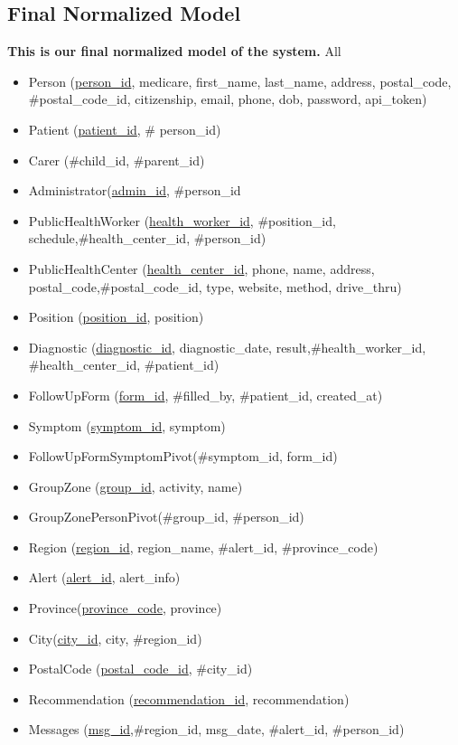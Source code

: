 \documentclass{article}
\begin{document}
\subsection{Final Normalized Model}
\begin{tcolorbox}
\textbf{This is our final normalized model of the system.} All
\begin{itemize}
    \item Person (\underline{person\_id}, medicare, first\_name, last\_name, address, postal\_code, \#postal\_code\_id, citizenship, email, phone, dob, password, api\_token)
    \item Patient (\underline{patient\_id}, \# person\_id)
    \item Carer (\#child\_id, \#parent\_id)
    \item Administrator(\underline{admin\_id}, \#person\_id
    \item PublicHealthWorker (\underline{health\_worker\_id}, \#position\_id, schedule,\#health\_center\_id, \#person\_id)
    \item PublicHealthCenter (\underline{health\_center\_id}, phone, name, address, postal\_code,\#postal\_code\_id, type, website, method, drive\_thru)
    \item Position (\underline{position\_id}, position)
    \item Diagnostic (\underline{diagnostic\_id}, diagnostic\_date, result,\#health\_worker\_id, \#health\_center\_id, \#patient\_id)
    \item FollowUpForm (\underline{form\_id}, \#filled\_by, \#patient\_id, created\_at)
    \item Symptom (\underline{symptom\_id}, symptom)
    \item FollowUpFormSymptomPivot(\#symptom\_id, form\_id)
    \item GroupZone (\underline{group\_id}, activity, name)
    \item GroupZonePersonPivot(\#group\_id, \#person\_id)
    \item Region (\underline{region\_id}, region\_name, \#alert\_id, \#province\_code)
    \item Alert (\underline{alert\_id}, alert\_info)
    \item Province(\underline{province\_code}, province)
    \item City(\underline{city\_id}, city, \#region\_id)
    \item PostalCode (\underline{postal\_code\_id}, \#city\_id)
    \item Recommendation (\underline{recommendation\_id}, recommendation)
    \item Messages (\underline{msg\_id},\#region\_id, msg\_date, \#alert\_id, \#person\_id)
    \end{itemize}
    \end{tcolorbox}
\newpage
\end{document}
